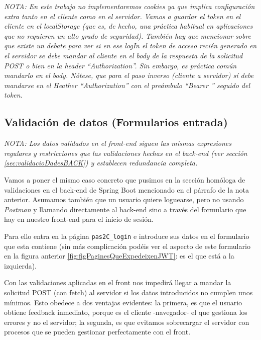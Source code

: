 \documentclass[a4paper,12pt]{report}
\begin{document}
	
	
\textit{NOTA: En este trabajo no implementaremos cookies ya que implica configuración extra tanto en el cliente como en el servidor. Vamos a guardar el token en el cliente en el localStorage (que es, de hecho, una práctica habitual en aplicaciones que no requieren un alto grado de seguridad). También hay que mencionar sobre que existe un debate para ver si en ese logIn el token de acceso recién generado en el servidor se debe mandar al cliente en el body de la respuesta de la solicitud POST \textit{o bien} en la header ``Authorization''. Sin embargo, es práctica común mandarlo en el body. Nótese, que para el paso inverso (cliente a servidor) sí debe mandarse en el Heather ``Authorization'' con el preámbulo ``Bearer '' seguido del token. }
	
	
	
	\subsection{Validación de datos (Formularios entrada)}
	\label{sec:validacioDadesFRONT}
	
	\textit{NOTA: Los datos validados en el front-end siguen las mismas expresiones regulares y restricciones que las validaciones hechas en el back-end (ver sección \ref{sec:validacioDadesBACK}) y establecen redundancia completa.}
	
	Vamos a poner el mismo caso concreto que pusimos en la sección homóloga de validaciones en el back-end de Spring Boot mencionado en el párrafo de la nota anterior. Asumamos también que un usuario quiere loguearse, pero no usando \textit{Postman} y llamando directamente al back-end sino a través del formulario que hay en nuestro front-end para el inicio de sesión.
	
	Para ello entra en la página \texttt{pas2C\_login} e introduce sus datos en el formulario que esta contiene (sin más complicación podéis ver el aspecto de este formulario en la figura anterior \ref{fig:figPaginesQueExpedeixenJWT}: es el que está a la izquierda).
	
	Con las validaciones aplicadas en el front nos impedirá llegar a mandar la solicitud POST (con fetch) al servidor si los datos introducidos no cumplen unos mínimos. Esto obedece a dos ventajas evidentes: la primera, es que el usuario obtiene feedback inmediato, porque es el cliente -navegador- el que gestiona los errores y no el servidor; la segunda, es que evitamos sobrecargar el servidor con procesos que se pueden gestionar perfectamente con el front.
	
\end{document}
